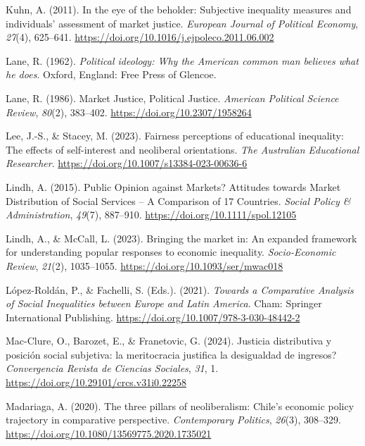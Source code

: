 \documentclass[
  12pt,
]{article}
\newlength{\cslhangindent}
\newenvironment{CSLReferences}[2] %
 {\begin{list}{}{%
  \setlength{\itemindent}{0pt}
  \setlength{\leftmargin}{0pt}
  \setlength{\parsep}{0pt}
  \ifodd #1
   \setlength{\leftmargin}{\cslhangindent}
   \setlength{\itemindent}{-1\cslhangindent}
  \fi
  \setlength{\itemsep}{#2\baselineskip}}}
 {\end{list}}
\begin{document}
\begin{CSLReferences}{1}{0}
Kuhn, A. (2011). In the eye of the beholder: {Subjective} inequality
measures and individuals' assessment of market justice. \emph{European
Journal of Political Economy}, \emph{27}(4), 625--641.
\url{https://doi.org/10.1016/j.ejpoleco.2011.06.002}

Lane, R. (1962). \emph{Political ideology: Why the {American} common man
believes what he does}. Oxford, England: Free Press of Glencoe.

Lane, R. (1986). Market {Justice}, {Political Justice}. \emph{American
Political Science Review}, \emph{80}(2), 383--402.
\url{https://doi.org/10.2307/1958264}

Lee, J.-S., \& Stacey, M. (2023). Fairness perceptions of educational
inequality: The effects of self-interest and neoliberal orientations.
\emph{The Australian Educational Researcher}.
\url{https://doi.org/10.1007/s13384-023-00636-6}

Lindh, A. (2015). Public {Opinion} against {Markets}? {Attitudes}
towards {Market Distribution} of {Social Services} -- {A Comparison} of
17 {Countries}. \emph{Social Policy \& Administration}, \emph{49}(7),
887--910. \url{https://doi.org/10.1111/spol.12105}

Lindh, A., \& McCall, L. (2023). Bringing the market in: An expanded
framework for understanding popular responses to economic inequality.
\emph{Socio-Economic Review}, \emph{21}(2), 1035--1055.
\url{https://doi.org/10.1093/ser/mwac018}

López-Roldán, P., \& Fachelli, S. (Eds.). (2021). \emph{Towards a
{Comparative Analysis} of {Social Inequalities} between {Europe} and
{Latin America}}. Cham: Springer International Publishing.
\url{https://doi.org/10.1007/978-3-030-48442-2}

Mac-Clure, O., Barozet, E., \& Franetovic, G. (2024). {Justicia
distributiva y posici{ó}n social subjetiva: {\textquestiondown}la
meritocracia justifica la desigualdad de ingresos?} \emph{Convergencia
Revista de Ciencias Sociales}, \emph{31}, 1.
\url{https://doi.org/10.29101/crcs.v31i0.22258}

Madariaga, A. (2020). The three pillars of neoliberalism: {Chile}'s
economic policy trajectory in comparative perspective.
\emph{Contemporary Politics}, \emph{26}(3), 308--329.
\url{https://doi.org/10.1080/13569775.2020.1735021}


\end{CSLReferences}
\end{document}
